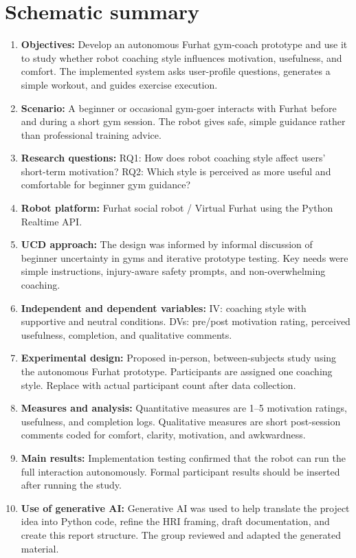 \documentclass[conference, onecolumn]{IEEEtran}
\begin{document}
\section*{Schematic summary}
\begin{enumerate}
    \item \textbf{Objectives:} Develop an autonomous Furhat gym-coach prototype and use it to study whether robot coaching style influences motivation, usefulness, and comfort. The implemented system asks user-profile questions, generates a simple workout, and guides exercise execution.
    \item \textbf{Scenario:} A beginner or occasional gym-goer interacts with Furhat before and during a short gym session. The robot gives safe, simple guidance rather than professional training advice.
    \item \textbf{Research questions:} RQ1: How does robot coaching style affect users' short-term motivation? RQ2: Which style is perceived as more useful and comfortable for beginner gym guidance?
    \item \textbf{Robot platform:} Furhat social robot / Virtual Furhat using the Python Realtime API.
    \item \textbf{UCD approach:} The design was informed by informal discussion of beginner uncertainty in gyms and iterative prototype testing. Key needs were simple instructions, injury-aware safety prompts, and non-overwhelming coaching.
    \item \textbf{Independent and dependent variables:} IV: coaching style with supportive and neutral conditions. DVs: pre/post motivation rating, perceived usefulness, completion, and qualitative comments.
    \item \textbf{Experimental design:} Proposed in-person, between-subjects study using the autonomous Furhat prototype. Participants are assigned one coaching style. Replace with actual participant count after data collection.
    \item \textbf{Measures and analysis:} Quantitative measures are 1--5 motivation ratings, usefulness, and completion logs. Qualitative measures are short post-session comments coded for comfort, clarity, motivation, and awkwardness.
    \item \textbf{Main results:} Implementation testing confirmed that the robot can run the full interaction autonomously. Formal participant results should be inserted after running the study.
    \item \textbf{Use of generative AI:} Generative AI was used to help translate the project idea into Python code, refine the HRI framing, draft documentation, and create this report structure. The group reviewed and adapted the generated material.
\end{enumerate}
\end{document}
